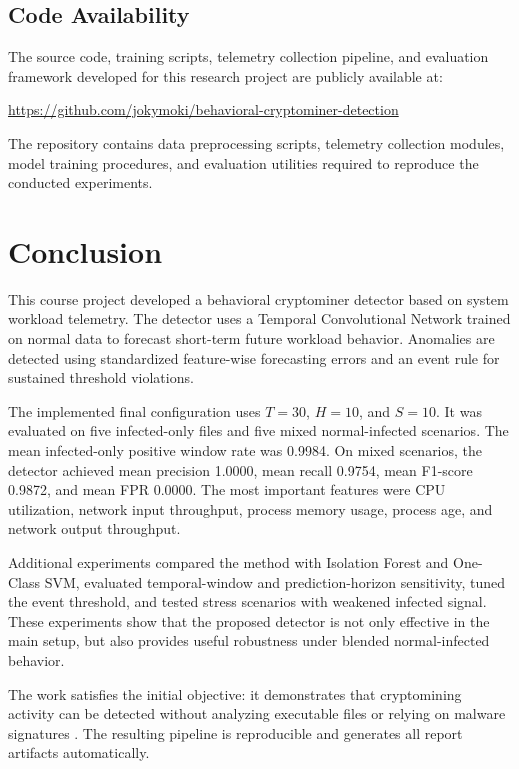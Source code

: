 \documentclass[a4paper,12pt]{extarticle}
\begin{document}
\subsection{Code Availability}

The source code, training scripts, telemetry collection pipeline, 
and evaluation framework developed for this research project are publicly available at:

\url{https://github.com/jokymoki/behavioral-cryptominer-detection}

The repository contains data preprocessing scripts, telemetry collection modules,
model training procedures, and evaluation utilities required to reproduce
the conducted experiments.

\section{Conclusion}
\label{sec:conclusion}

This course project developed a behavioral cryptominer detector based on system workload telemetry. The detector uses a Temporal Convolutional Network \cite{bai2018tcn} trained on normal data to forecast short-term future workload behavior. Anomalies are detected using standardized feature-wise forecasting errors and an event rule for sustained threshold violations.

The implemented final configuration uses $T=30$, $H=10$, and $S=10$. It was evaluated on five infected-only files and five mixed normal-infected scenarios. The mean infected-only positive window rate was 0.9984. On mixed scenarios, the detector achieved mean precision 1.0000, mean recall 0.9754, mean F1-score 0.9872, and mean FPR 0.0000. The most important features were CPU utilization, network input throughput, process memory usage, process age, and network output throughput.

Additional experiments compared the method with Isolation Forest and One-Class SVM, evaluated temporal-window and prediction-horizon sensitivity, tuned the event threshold, and tested stress scenarios with weakened infected signal. These experiments show that the proposed detector is not only effective in the main setup, but also provides useful robustness under blended normal-infected behavior.

The work satisfies the initial objective: it demonstrates that cryptomining activity can be detected without analyzing executable files or relying on malware signatures \cite{redhu2024deep}. The resulting pipeline is reproducible and generates all report artifacts automatically. 

\newpage
{}
{}
\nocite{*}
\printbibliography[title={References}]
\end{document}
